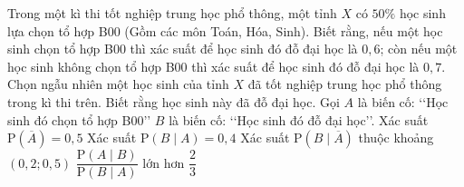 \begin{ex}%
	Trong một kì thi tốt nghiệp trung học phổ thông, một tỉnh $X$ có $50\%$ học sinh lựa chọn tổ hợp B00 (Gồm các môn Toán, Hóa, Sinh). Biết rằng, nếu một học sinh chọn tổ hợp B00 thì xác suất để học sinh đó đỗ đại học là $0{,}6$; còn nếu một học sinh không chọn tổ hợp B00 thì xác suất để học sinh đó đỗ đại học là $0{,}7$. Chọn ngẫu nhiên một học sinh của tỉnh $X$ đã tốt  nghiệp trung học phổ thông trong kì thi trên. Biết rằng học sinh này đã đỗ đại học. Gọi $A$ là biến cố: \lq\lq Học sinh đó chọn tổ hợp B00\rq\rq\; $B$ là biến cố: \lq\lq Học sinh đó đỗ đại học\rq\rq.
	\choiceTF 
		{\True Xác  suất $\mathrm{P}\left(\overline{A}\right)=0{,}5$}
		 {Xác suất $\mathrm{P}(B\mid A)=0{,}4$}
		{\True Xác suất $\mathrm{P}\left(B\mid \overline{A}\right)$ thuộc khoảng  $(0{,}2; 0{,}5)$}
		 {$\dfrac{\mathrm{P}(A\mid B)}{\mathrm{P}(B\mid A)}$ lớn hơn $\dfrac{2}{3}$}
\end{ex}

